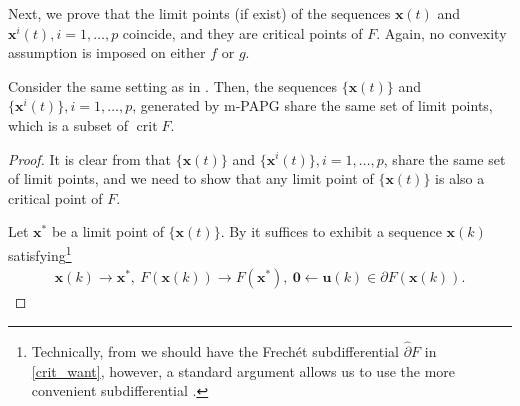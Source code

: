 \documentclass[leqno,onefignum,onetabnum]{siamart0516}
\newcommand{\xb}{\mathbf{x}}
\newcommand{\ub}{\mathbf{u}}
\newcommand{\zero}{\mathbf{0}}
\newcommand{\crit}{\mathop{\mathrm{crit}}}
\newcommand{\mspg}{\textsf{m-PAPG}\xspace}
\begin{document}
Next, we prove that the limit points (if exist) of the sequences $\xb(t)$ and $\xb^i(t), i=1,\ldots, p$ coincide, and they are critical points of $F$. Again, no convexity assumption is imposed on either $f$ or $g$.

\begin{theorem}\label{thm:limitcon_1}
	Consider the same setting as in . Then, the sequences $\{\xb(t)\}$ and $\{\xb^i(t)\}, i = 1,\ldots, p$, generated by \mspg share the same set of limit points, which is a subset of $\crit F$.
\end{theorem}

\begin{proof}
	It is clear from  that $\{\xb(t)\}$ and $\{\xb^i(t)\}, i=1, \ldots, p$, share the same set of limit points, and we need to show that any limit point of $\{\xb(t)\}$ is also a critical point of $F$.
	 
	Let $\xb^*$ be a limit point of $\{\xb(t)\}$. By  it suffices to exhibit a sequence $\xb(k)$ satisfying\footnote{Technically, from  we should have the Frech\'et subdifferential $\hat{\partial} F$ in \cref{crit_want}, however, a standard argument allows us to use the more convenient subdifferential \cite[Proposition 8.7]{vari_ana}.} 
	\begin{align}\label{crit_want}
	\xb(k) \to \xb^*, ~ F(\xb(k)) \to F(\xb^*), ~ \zero \leftarrow \ub(k) \in \partial F(\xb(k)).
	\end{align} 
	

\end{proof}
\end{document}
